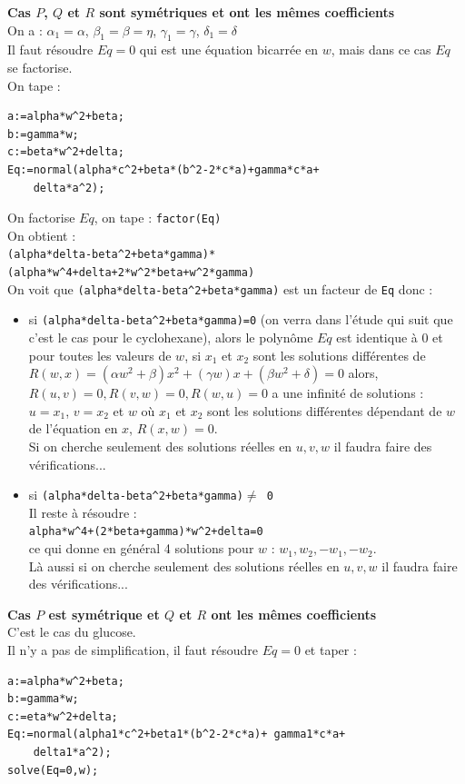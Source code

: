 \documentclass[a4paper,11pt]{book}
\begin{document}
{\bf Cas $P$, $Q$ et $R$ sont sym\'etriques et ont les m\^emes coefficients}\\
On a :
$\alpha_1=\alpha$, $\beta_1=\beta=\eta$, $\gamma_1=\gamma$, $\delta_1=\delta$\\ 
Il faut r\'esoudre $Eq=0$ qui est une \'equation bicarr\'ee en $w$, mais dans 
ce cas $Eq$ se factorise.\\
 On tape :
\begin{verbatim}
a:=alpha*w^2+beta;
b:=gamma*w;
c:=beta*w^2+delta;
Eq:=normal(alpha*c^2+beta*(b^2-2*c*a)+gamma*c*a+
    delta*a^2);
\end{verbatim}
On factorise $Eq$, on tape :
{\tt factor(Eq)}\\
On obtient :\\
{\tt (alpha*delta-beta\verb|^|2+beta*gamma)*}\\
{\tt (alpha*w\verb|^|4+delta+2*w\verb|^|2*beta+w\verb|^|2*gamma)}\\
On voit que {\tt (alpha*delta-beta\verb|^|2+beta*gamma)} est un facteur de 
{\tt Eq}  donc :
\begin{itemize}
\item si {\tt (alpha*delta-beta\verb|^|2+beta*gamma)=0} (on verra dans 
l'\'etude qui suit que c'est le cas pour le cyclohexane),
alors le polyn\^ome $Eq$ est identique \`a 0 et pour toutes les valeurs de 
$w$, si $x_1$ et $x_2$ sont les  solutions diff\'erentes de 
$R(w,x)=(\alpha w^2+\beta)x^2+(\gamma w)x+(\beta w^2+\delta)=0$ alors,\\
$R(u,v)=0,R(v,w)=0,R(w,u)=0$ a  une infinit\'e de solutions :\\
 $u=x_1$, $v=x_2$ et $w$ o\`u $x_1$ et $x_2$ sont les solutions diff\'erentes 
d\'ependant de $w$ de l'\'equation en $x$, $R(x,w)=0$.\\
Si on cherche seulement des solutions r\'eelles en $u,v,w$ il faudra faire des 
v\'erifications...
\item si {\tt (alpha*delta-beta\verb|^|2+beta*gamma)$\neq$ 0}\\
Il reste \`a r\'esoudre :\\
{\tt alpha*w\verb|^|4+(2*beta+gamma)*w\verb|^|2+delta=0}\\
ce qui donne en g\'en\'eral 4 solutions pour $w$ : $w_1,w_2,-w_1,-w_2$.\\
L\`a aussi si on cherche seulement des solutions r\'eelles en $u,v,w$ il 
faudra faire des v\'erifications...
\end{itemize}
{\bf Cas $P$ est sym\'etrique et  $Q$ et $R$ ont les m\^emes coefficients}\\
C'est le cas du glucose.\\
Il n'y a pas de simplification, il faut r\'esoudre $Eq=0$ et taper :
\begin{verbatim}
a:=alpha*w^2+beta;
b:=gamma*w;
c:=eta*w^2+delta;
Eq:=normal(alpha1*c^2+beta1*(b^2-2*c*a)+ gamma1*c*a+
    delta1*a^2);
solve(Eq=0,w);
\end{verbatim}
\end{document}
